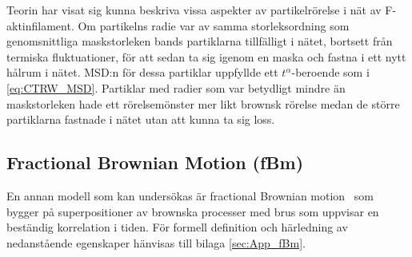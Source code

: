 \begin{comment}
Positionsändringen och väntetiden beskrivs av två oberoende stokastiska variabler. 
MSD för denna typ av rörelse blir\cite{Barkai_MSDCTRW2007}
\begin{equation}
    \ev{x^2(t)} \approx \frac{\ev{\Delta x^2}}{A \Gamma(1+\alpha)}t^{\alpha} + \frac{2\ev{\Delta x}^2}{\Gamma(1+2\alpha)A^2} t^{2\alpha}, 
\end{equation}
där $A$ är en konstant som dyker upp i fördelningsfunktionen för väntetiderna, $\Gamma$ är gammafunktionen, $\alpha$ en konstant som uppfyller $0<\alpha<1$ och $\Delta x$ steget mellan två positioner. Om $\ev{\Delta x}=0 $ försvinner andra termen och rörelsens MSD blir proportionell mot $t^\alpha$. Eftersom $\alpha < 1$ blir MSD:n inte linjär i tiden, utan ändringstakten kommer att avta med tiden och rörelsen skiljer sig från den klassiska brownska rörelsen.
\end{comment}

Teorin har visat sig kunna beskriva vissa aspekter av partikelrörelse i nät av F-aktinfilament\cite{Barkai_CTRW}. Om partikelns radie var av samma storleksordning som genomsnittliga maskstorleken bands partiklarna tillfälligt i nätet, bortsett från termiska fluktuationer, för att sedan ta sig igenom en maska och fastna i ett nytt hålrum i nätet. MSD:n för dessa partiklar uppfyllde ett $t^{\alpha}$-beroende som i \eqref{eq:CTRW_MSD}. Partiklar med radier som var betydligt mindre än maskstorleken hade ett rörelsemönster mer likt brownsk rörelse medan de större partiklarna fastnade i nätet utan att kunna ta sig loss.



\subsection{Fractional Brownian Motion (fBm)}

En annan modell som kan undersökas är fractional Brownian motion~\cite{Mandelbrot_fBm1968} som bygger på superpositioner av brownska processer med brus som uppvisar en beständig korrelation i tiden. För formell definition och härledning av nedanstående egenskaper hänvisas till bilaga \ref{sec:App_fBm}.

